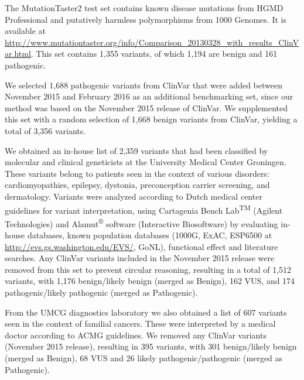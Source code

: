 The MutationTaster2\cite{Schwarz_2014} test set contains known disease mutations from HGMD\cite{Stenson_2013} Professional and putatively harmless polymorphisms from 1000 Genomes.
It is available at \url{http://www.mutationtaster.org/info/Comparison_20130328_with_results_ClinVar.html}.
This set contains 1,355 variants, of which 1,194 are benign and 161 pathogenic.

We selected 1,688 pathogenic variants from ClinVar that were added between November 2015 and February 2016 as an additional benchmarking set, since our method was based on the November 2015 release of ClinVar.
We supplemented this set with a random selection of 1,668 benign variants from ClinVar, yielding a total of 3,356 variants.

We obtained an in-house list of 2,359 variants that had been classified by molecular and clinical geneticists at the University Medical Center Groningen.
These variants belong to patients seen in the context of various disorders: cardiomyopathies, epilepsy, dystonia, preconception carrier screening, and dermatology.
Variants were analyzed according to Dutch medical center guidelines\cite{ACGN} for variant interpretation, using Cartagenia Bench Lab\textsuperscript{TM} (Agilent Technologies) and Alamut\textsuperscript{®} software (Interactive Biosoftware) by evaluating in-house databases, known population databases (1000G\cite{Auton_2015}, ExAC, ESP6500 at \url{http://evs.gs.washington.edu/EVS/}, GoNL\cite{Francioli_2014}), functional effect and literature searches.
Any ClinVar variants included in the November 2015 release were removed from this set to prevent circular reasoning, resulting in a total of 1,512 variants, with 1,176 benign/likely benign (merged as Benign), 162 VUS, and 174 pathogenic/likely pathogenic (merged as Pathogenic).

From the UMCG diagnostics laboratory we also obtained a list of 607 variants seen in the context of familial cancers.
These were interpreted by a medical doctor according to ACMG guidelines\cite{Richards_2015}.
We removed any ClinVar variants (November 2015 release), resulting in 395 variants, with 301 benign/likely benign (merged as Benign), 68 VUS and 26 likely pathogenic/pathogenic (merged as Pathogenic).

